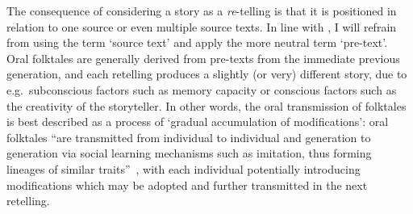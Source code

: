 The consequence of considering a story as a \emph{re}-telling is that it is positioned in relation to one source or even multiple source texts. In line with \citeauthor{stephens_mccallum}, I will refrain from using the term `source text' and apply the more neutral term `pre-text'\autocite{stephens_mccallum}. Oral folktales are generally derived from pre-texts from the immediate previous generation\autocite[See][]{rubin:1995}, and each retelling produces a slightly (or very) different story, due to e.g.\ subconscious factors such as memory capacity\autocite[Cf.][]{bartlett} or conscious factors such as the creativity of the storyteller\autocite[Cf.][]{boyd:2009}. In other words, the oral transmission of folktales is best described as a process of `gradual accumulation of modifications': oral folktales ``are transmitted from individual to individual and generation to generation via social learning mechanisms such as imitation, thus forming lineages of similar traits''~\autocite[90]{mesoudi:2011}, with each individual potentially introducing modifications which may be adopted and further transmitted in the next retelling.  

